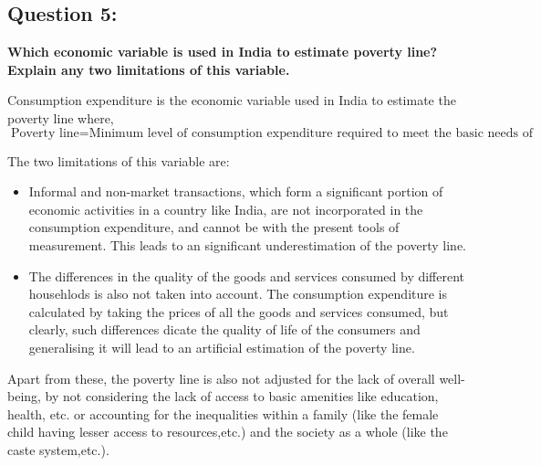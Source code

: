 \documentclass{article}
\begin{document}
\subsection*{Question 5:}
\textbf{Which economic variable is used in India to estimate poverty line?
Explain any two limitations of this variable.}

Consumption expenditure is the economic variable used in India to estimate the poverty line where,
\begin{equation}
    \text{Poverty line} = \text{Minimum level of consumption expenditure required to meet the basic needs of the households}
\end{equation}

The two limitations of this variable are:
\begin{itemize}
    \item Informal and non-market transactions, which form a significant portion of economic activities 
          in a country like India, are not incorporated in the consumption expenditure, and cannot be with the present tools of measurement.
          This leads to an significant underestimation of the poverty line.
    \item The differences in the quality of the goods and services consumed by different househlods is also not taken into account.
          The consumption expenditure is calculated by taking the prices of all the goods and services consumed, but clearly,
          such differences dicate the quality of life of the consumers and generalising it will 
          lead to an artificial estimation of the poverty line.
\end{itemize}
Apart from these, the poverty line is also not adjusted for the lack of overall well-being, by
not considering the lack of access to basic amenities like education, health, etc. or accounting for the inequalities within a family 
(like the female child having lesser access to resources,etc.) and the society as a whole (like the caste system,etc.).
\end{document}
